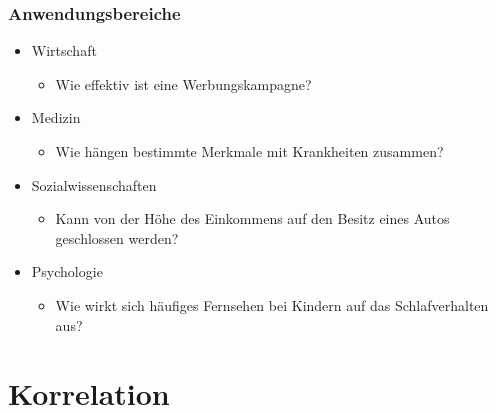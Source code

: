 \documentclass{beamer}
\begin{document}
\begin{frame}
 \frametitle{Anwendungsbereiche}

 \begin{itemize}
  \item Wirtschaft
  \begin{itemize}
   \item Wie effektiv ist eine Werbungskampagne?
  \end{itemize}

  \item Medizin
  \begin{itemize}
   \item Wie h\"angen bestimmte Merkmale mit Krankheiten zusammen?
  \end{itemize}

  \item Sozialwissenschaften
  \begin{itemize}
   \item Kann von der H\"ohe des Einkommens auf den Besitz eines Autos geschlossen werden?
  \end{itemize}

  \item Psychologie
  \begin{itemize}
   \item Wie wirkt sich h\"aufiges Fernsehen bei Kindern auf das Schlafverhalten aus?
  \end{itemize}

 \end{itemize}

\end{frame}

\section{Korrelation}
\end{document}
